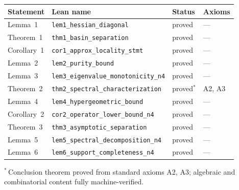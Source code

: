 \documentclass[twocolumn,prx,aps,superscriptaddress,longbibliography,floatfix]{revtex4-2}
\begin{document}
\smallskip
\noindent
{\footnotesize
\begin{tabular}{@{}llll@{}}
\hline
\textbf{Statement} & \textbf{Lean name} & \textbf{Status} & \textbf{Axioms} \\
\hline
Lemma~1     & \texttt{lem1\_hessian\_diagonal}              & proved       & ---        \\
Theorem~1   & \texttt{thm1\_basin\_separation}              & proved       & ---        \\
Corollary~1 & \texttt{cor1\_approx\_locality\_stmt}         & proved       & ---        \\
Lemma~2     & \texttt{lem2\_purity\_bound}                  & proved       & ---        \\
Lemma~3     & \texttt{lem3\_eigenvalue\_monotonicity\_n4}   & proved       & ---        \\
Theorem~2   & \texttt{thm2\_spectral\_characterization}     & proved$^*$   & A2, A3     \\
Lemma~4     & \texttt{lem4\_hypergeometric\_bound}          & proved       & ---        \\
Corollary~2 & \texttt{cor2\_operator\_lower\_bound\_n4}     & proved       & ---        \\
Theorem~3   & \texttt{thm3\_asymptotic\_separation}         & proved       & ---        \\
Lemma~5     & \texttt{lem5\_spectral\_decomposition\_n4}    & proved       & ---        \\
Lemma~6     & \texttt{lem6\_support\_completeness\_n4}      & proved       & ---        \\
\hline
\end{tabular}}

\smallskip
\noindent
${}^*$\,Conclusion theorem proved from standard axioms A2, A3;
algebraic and combinatorial content fully machine-verified.
\end{document}
